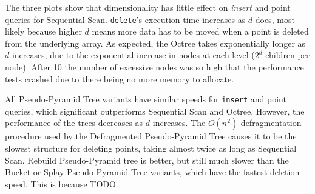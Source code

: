 The three plots show that dimensionality has little effect on \textit{insert} and point queries for Sequential Scan. \texttt{delete}'s execution time increases as $d$ does, most likely because higher $d$ means more data has to be moved when a point is deleted from the underlying array. As expected, the Octree takes exponentially longer as $d$ increases, due to the exponential increase in nodes at each level ($2^d$ children per node). After 10 the number of excessive nodes was so high that the performance tests crashed due to there being no more memory to allocate.

All Pseudo-Pyramid Tree variants have similar speeds for \texttt{insert} and point queries, which significant outperforms Sequential Scan and Octree. However, the performance of the trees decreases as $d$ increases. The $O(n^2)$ defragmentation procedure used by the Defragmented Pseudo-Pyramid Tree causes it to be the slowest structure for deleting points, taking almost twice as long as Sequential Scan. Rebuild Pseudo-Pyramid tree is better, but still much slower than the Bucket or Splay Pseudo-Pyramid Tree variants, which have the fastest deletion speed. This is because TODO.

